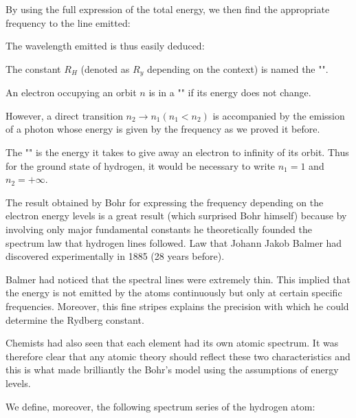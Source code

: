 By using the full expression of the total energy, we then find the appropriate frequency to the line emitted:
	
The wavelength emitted is thus easily deduced:
	
The constant $R_H$ (denoted as $R_y$ depending on the context) is named the "".

An electron occupying an orbit $n$ is in a "" if its energy does not change.

However, a direct transition $n_2 \rightarrow n_1 (n_1<n_2)$ is accompanied by the emission of a photon whose energy is given by the frequency as we proved it before.

The "" is the energy it takes to give away an electron to infinity of its orbit. Thus for the ground state of hydrogen, it would be necessary to write $n_1=1$ and $n_2=+\infty$.

The result obtained by Bohr for expressing the frequency depending on the electron energy levels is a great result (which surprised Bohr himself) because by involving only major fundamental constants he theoretically founded the spectrum law that hydrogen lines followed. Law that Johann Jakob Balmer had discovered experimentally in 1885 (28 years before).

Balmer had noticed that the spectral lines were extremely thin. This implied that the energy is not emitted by the atoms continuously but only at certain specific frequencies. Moreover, this fine stripes explains the precision with which he could determine the Rydberg constant.

Chemists had also seen that each element had its own atomic spectrum. It was therefore clear that any atomic theory should reflect these two characteristics and this is what made brilliantly the Bohr's model using the assumptions of energy levels.

We define, moreover, the following spectrum series of the hydrogen atom:

